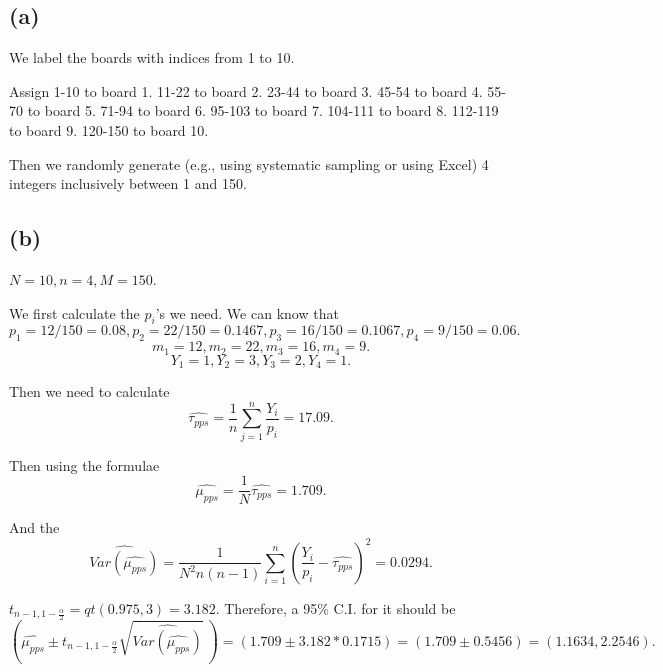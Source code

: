\documentclass[12pt]{article}%
\begin{document}
\subsection{(a)}
We label the boards with indices from 1 to 10.

Assign 1-10 to board 1. 
11-22 to board 2.
23-44 to board 3.
45-54 to board 4.
55-70 to board 5.
71-94 to board 6.
95-103 to board 7.
104-111 to board 8.
112-119 to board 9.
120-150 to board 10.

Then we randomly generate (e.g., using systematic sampling or using 
Excel) 4 integers inclusively between 1 and 150.

\subsection{(b)}
$N=10,n=4,M=150.$

We first calculate the $p_i$'s we need. We can know that 
$$p_1=12/150=0.08, p_2=22/150=0.1467, 
p_3=16/150=0.1067, p_4=9/150=0.06.$$
$$m_1=12,m_2=22,m_3=16, m_4=9.$$
$$Y_1=1,Y_2=3,Y_3=2,Y_4=1.$$

Then we need to calculate 
$$\hat{\tau_{pps}}=\frac{1}{n}\sum_{j=1}^n \frac{Y_i}{p_i}=17.09.$$

Then using the formulae 
$$\hat{\mu_{pps}}=\frac{1}{N} \hat{\tau_{pps}}=1.709.$$

And the $$\widehat{Var(\hat{\mu_{pps}})}
=\frac{1}{N^2n(n-1)} \sum_{i=1}^n (\frac{Y_i}{p_i}-\hat{\tau_{pps}})^2=0.0294.$$

$t_{n-1,1-\frac{\alpha}{2}}=qt(0.975,3)=3.182.$
Therefore, a 95\% C.I. for it should be 
$$( \hat{\mu_{pps}} \pm t_{n-1,1-\frac{\alpha}{2}} \sqrt{\widehat{Var(\hat{\mu_{pps}})}} ~)
=(1.709 \pm 3.182* 0.1715 )=(1.709 \pm 0.5456)=(1.1634,2.2546).$$
\end{document}
